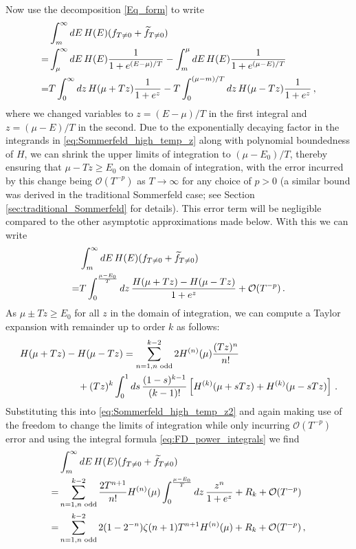 \documentclass[sn-mathphys,Numbered]{sn-jnl}
\begin{document}
Now use  the decomposition \eqref{Eq_form} to write
\begin{align}
    &\int_m^\infty dE\, H(E)(f_{T\neq 0}+\widetilde{f}_{T\neq 0})\notag\\
    =&\int_\mu^\infty dE \,H(E)\frac{1}{1+e^{(E-\mu)/T}}-\int_m^\mu dE\, H(E)\frac{1}{1+e^{(\mu-E)/T}}\notag\\
=&T\int_0^\infty dz \,H(\mu+Tz)\frac{1}{1+e^{z}}-T\int^{(\mu-m)/T}_0 dz\, H(\mu-Tz)\frac{1}{1+e^{z}}\,,\label{eq:Sommerfeld_high_temp_z}
\end{align}
where we changed variables to $z=(E-\mu)/T$ in the first integral and $z=(\mu-E)/T$ in the second.  Due to the exponentially decaying factor in the integrands in \eqref{eq:Sommerfeld_high_temp_z} along with polynomial boundedness of $H$, we can shrink the upper limits of integration  to $(\mu-E_0)/T$, thereby ensuring that $\mu-Tz\geq E_0$ on the domain of integration, with the  error incurred by this change being $\mathcal{O}(T^{-p})$ as $T\to \infty$ for any choice of $p>0$ (a similar bound was derived in the traditional Sommerfeld case; see Section \ref{sec:traditional_Sommerfeld} for details). This error term will be negligible compared to the other asymptotic approximations made below.  With this we can write
\begin{align}
    &\int_m^\infty dE\, H(E)(f_{T\neq 0}+\widetilde{f}_{T\neq 0})\notag\\
=&T\int_0^{\frac{\mu-E_0}{T}} dz \,\frac{H(\mu+Tz)- H(\mu-Tz)}{1+e^{z}}+\mathcal{O}(T^{-p})\,. \label{eq:Sommerfeld_high_temp_z2}
\end{align}
As $\mu\pm Tz\geq E_0$ for all $z$ in the domain of integration, we can compute a Taylor expansion with remainder up to order $k$ as follows:
\begin{align}
 &H(\mu+Tz)- H(\mu-Tz)=\sum_{n=1,n\text{ odd}}^{k-2} 2H^{(n)}(\mu)\frac{(Tz)^n}{n!}\\
 &\qquad\qquad\qquad+(Tz)^k \int_0^1 ds\,\frac{(1-s)^{k-1}}{(k-1)!} \left[H^{(k)}(\mu+sTz)+H^{(k)}(\mu-sTz)\right]\,. \notag
\end{align}
Substituting this into \eqref{eq:Sommerfeld_high_temp_z2} and again making use of the freedom to change the limits of integration while only incurring $\mathcal{O}(T^{-p})$ error and using the integral formula \eqref{eq:FD_power_integrals} we find
\begin{align}
    &\int_m^\infty dE\, H(E)(f_{T\neq 0}+\widetilde{f}_{T\neq 0})\notag\\
    =&\sum_{n=1,n\text{ odd}}^{k-2} \frac{2T^{n+1}}{n!}H^{(n)}(\mu)\int_0^{\frac{\mu-E_0}{T}} dz \,\frac{z^n}{1+e^{z}}+R_k
+\mathcal{O}(T^{-p})\notag\\
=&\sum_{n=1,n\text{ odd}}^{k-2} 2(1-2^{-n})\zeta(n+1)T^{n+1}H^{(n)}(\mu)
+R_k
+\mathcal{O}(T^{-p})\,,\label{eq:Sommerfeld_high_temp_z3}
\end{align}
\end{document}

